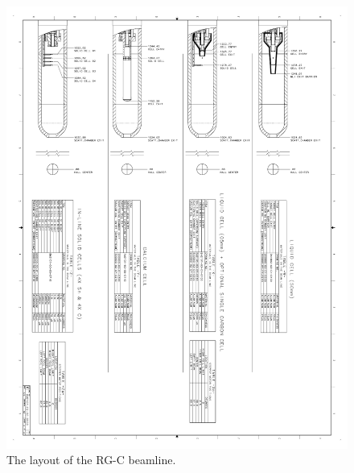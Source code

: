 \documentclass[12pt]{article}
\begin{document}
\begin{figure}[hbt]
\vspace{-2cm}
\begin{center}
\includegraphics[width=6in]{rgm_beam_page4.pdf}
\end{center}
\caption{ \label{fig:beamline4} 
The layout of the RG-C beamline. }
\end{figure}




%
\end{document}
